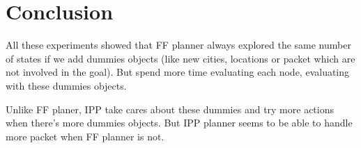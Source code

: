 \section{Conclusion}

All these experiments showed that FF planner always explored the same number of states if we add dummies objects (like new cities, locations or packet which are not involved in the goal). But spend more time evaluating each node, evaluating with these dummies objects.

Unlike FF planer, IPP take cares about these dummies and try more actions when there's more dummies objects. But IPP planner seems to be able to handle more packet when FF planner is not.

